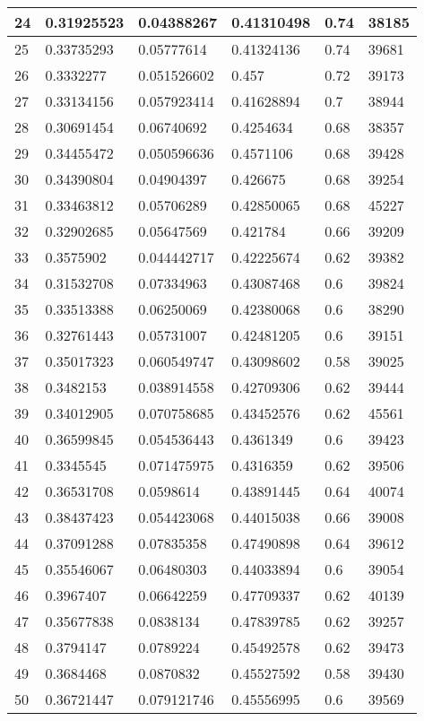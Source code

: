\begin{longtable}{|l|l|l|l|l|l|}
24 & 0.31925523 & 0.04388267 & 0.41310498 & 0.74 & 38185 \\ \hline 
25 & 0.33735293 & 0.05777614 & 0.41324136 & 0.74 & 39681 \\ \hline 
26 & 0.3332277 & 0.051526602 & 0.457 & 0.72 & 39173 \\ \hline 
27 & 0.33134156 & 0.057923414 & 0.41628894 & 0.7 & 38944 \\ \hline 
28 & 0.30691454 & 0.06740692 & 0.4254634 & 0.68 & 38357 \\ \hline 
29 & 0.34455472 & 0.050596636 & 0.4571106 & 0.68 & 39428 \\ \hline 
30 & 0.34390804 & 0.04904397 & 0.426675 & 0.68 & 39254 \\ \hline 
31 & 0.33463812 & 0.05706289 & 0.42850065 & 0.68 & 45227 \\ \hline 
32 & 0.32902685 & 0.05647569 & 0.421784 & 0.66 & 39209 \\ \hline 
33 & 0.3575902 & 0.044442717 & 0.42225674 & 0.62 & 39382 \\ \hline 
34 & 0.31532708 & 0.07334963 & 0.43087468 & 0.6 & 39824 \\ \hline 
35 & 0.33513388 & 0.06250069 & 0.42380068 & 0.6 & 38290 \\ \hline 
36 & 0.32761443 & 0.05731007 & 0.42481205 & 0.6 & 39151 \\ \hline 
37 & 0.35017323 & 0.060549747 & 0.43098602 & 0.58 & 39025 \\ \hline 
38 & 0.3482153 & 0.038914558 & 0.42709306 & 0.62 & 39444 \\ \hline 
39 & 0.34012905 & 0.070758685 & 0.43452576 & 0.62 & 45561 \\ \hline 
40 & 0.36599845 & 0.054536443 & 0.4361349 & 0.6 & 39423 \\ \hline 
41 & 0.3345545 & 0.071475975 & 0.4316359 & 0.62 & 39506 \\ \hline 
42 & 0.36531708 & 0.0598614 & 0.43891445 & 0.64 & 40074 \\ \hline 
43 & 0.38437423 & 0.054423068 & 0.44015038 & 0.66 & 39008 \\ \hline 
44 & 0.37091288 & 0.07835358 & 0.47490898 & 0.64 & 39612 \\ \hline 
45 & 0.35546067 & 0.06480303 & 0.44033894 & 0.6 & 39054 \\ \hline 
46 & 0.3967407 & 0.06642259 & 0.47709337 & 0.62 & 40139 \\ \hline 
47 & 0.35677838 & 0.0838134 & 0.47839785 & 0.62 & 39257 \\ \hline 
48 & 0.3794147 & 0.0789224 & 0.45492578 & 0.62 & 39473 \\ \hline 
49 & 0.3684468 & 0.0870832 & 0.45527592 & 0.58 & 39430 \\ \hline 
50 & 0.36721447 & 0.079121746 & 0.45556995 & 0.6 & 39569 \\ \hline 
\end{longtable}